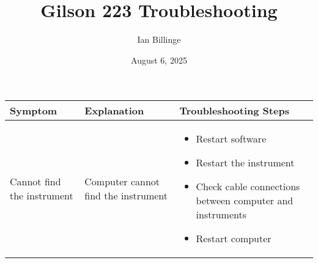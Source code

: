 \documentclass[11pt, oneside]{article}   	%
\title{Gilson 223 Troubleshooting}
\author{Ian Billinge}
\date{August 6, 2025}							%
\begin{document}
\maketitle

\begin{tabular}{p{3cm} p{3cm} p{10cm}}
	\hline

	Symptom & Explanation & Troubleshooting Steps \\
	\hline 
	\hline
	Cannot find the instrument & Computer cannot find the instrument &
	 \begin{itemize}
		\item Restart software
		\item Restart the instrument
		\item Check cable connections between computer and instruments
		\item Restart computer
		\end{itemize} \\
		\hline


\end{tabular}
\end{document}
